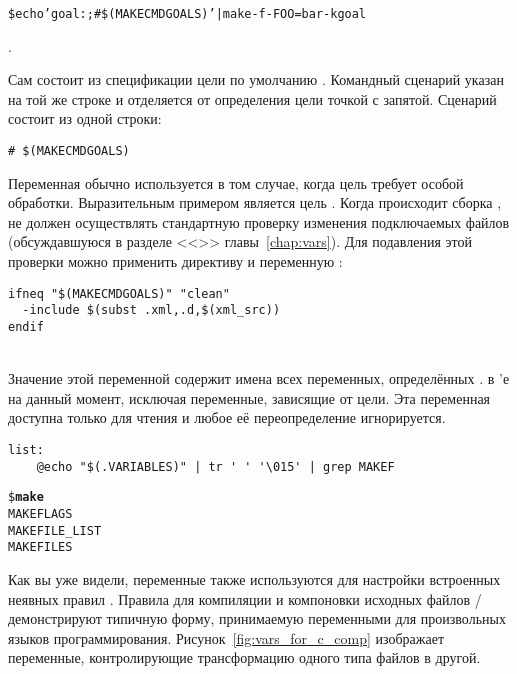 \begin{description}
{\begin{alltt}
\$ echo 'goal:;\#{} \$(MAKECMDGOALS)' | make -f- FOO=bar -k goal
\end{alltt}
}.

Сам \Makefile{} состоит из спецификации цели по умолчанию
. Командный сценарий указан на той же строке и
отделяется от определения цели точкой с запятой. Сценарий состоит из
одной строки:

{\footnotesize
\begin{verbatim}
# $(MAKECMDGOALS)
\end{verbatim}
}

Переменная  обычно используется в том случае,
когда цель требует особой обработки. Выразительным примером является
цель . Когда происходит сборка ,
\GNUmake{} не должен осуществлять стандартную проверку изменения
подключаемых файлов (обсуждавшуюся в разделе
<<>> главы~\ref{chap:vars}).  Для
подавления этой проверки можно применить директиву  и
переменную :

{\footnotesize
\begin{verbatim}
ifneq "$(MAKECMDGOALS)" "clean"
  -include $(subst .xml,.d,$(xml_src))
endif
\end{verbatim}
}

\item[\variable{.VARIABLES}] \hfill \\
Значение этой переменной содержит имена всех переменных, определённых
.
в \Makefile{}'е на данный момент, исключая переменные, зависящие от
цели. Эта переменная доступна только для чтения и любое её
переопределение игнорируется.

{\footnotesize
\begin{verbatim}
list:
    @echo "$(.VARIABLES)" | tr ' ' '\015' | grep MAKEF
\end{verbatim}
}

{\footnotesize
\begin{alltt}
\$ \textbf{make}
MAKEFLAGS
MAKEFILE\_LIST
MAKEFILES
\end{alltt}
}
\end{description}

Как вы уже видели, переменные также используются для настройки
встроенных неявных правил \GNUmake{}. Правила для компиляции и
компоновки исходных файлов \Clang{}/\Cplusplus{} демонстрируют
типичную форму, принимаемую переменными для произвольных языков
программирования.  Рисунок~\ref{fig:vars_for_c_comp} изображает
переменные, контролирующие трансформацию одного типа файлов в другой.

